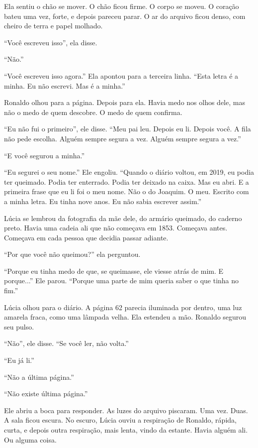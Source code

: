 \noindent Ela sentiu o chão se mover. O chão ficou firme. O corpo se moveu. O coração bateu uma vez, forte, e depois pareceu parar. O ar do arquivo ficou denso, com cheiro de terra e papel molhado.

\noindent ``Você escreveu isso'', ela disse.

\noindent ``Não.''

\noindent ``Você escreveu isso agora.'' Ela apontou para a terceira linha. ``Esta letra é a minha. Eu não escrevi. Mas é a minha.''

\noindent Ronaldo olhou para a página. Depois para ela. Havia medo nos olhos dele, mas não o medo de quem descobre. O medo de quem confirma.

\noindent ``Eu não fui o primeiro'', ele disse. ``Meu pai leu. Depois eu li. Depois você. A fila não pede escolha. Alguém sempre segura a vez. Alguém sempre segura a vez.''

\noindent ``E você segurou a minha.''

\noindent ``Eu segurei o seu nome.'' Ele engoliu. ``Quando o diário voltou, em 2019, eu podia ter queimado. Podia ter enterrado. Podia ter deixado na caixa. Mas eu abri. E a primeira frase que eu li foi o meu nome. Não o do Joaquim. O meu. Escrito com a minha letra. Eu tinha nove anos. Eu não sabia escrever assim.''

\noindent Lúcia se lembrou da fotografia da mãe dele, do armário queimado, do caderno preto. Havia uma cadeia ali que não começava em 1853. Começava antes. Começava em cada pessoa que decidia passar adiante.

\noindent ``Por que você não queimou?'' ela perguntou.

\noindent ``Porque eu tinha medo de que, se queimasse, ele viesse atrás de mim. E porque...'' Ele parou. ``Porque uma parte de mim queria saber o que tinha no fim.''

\noindent Lúcia olhou para o diário. A página 62 parecia iluminada por dentro, uma luz amarela fraca, como uma lâmpada velha. Ela estendeu a mão. Ronaldo segurou seu pulso.

\noindent ``Não'', ele disse. ``Se você ler, não volta.''

\noindent ``Eu já li.''

\noindent ``Não a última página.''

\noindent ``Não existe última página.''

\noindent Ele abriu a boca para responder. As luzes do arquivo piscaram. Uma vez. Duas. A sala ficou escura. No escuro, Lúcia ouviu a respiração de Ronaldo, rápida, curta, e depois outra respiração, mais lenta, vindo da estante. Havia alguém ali. Ou alguma coisa.

